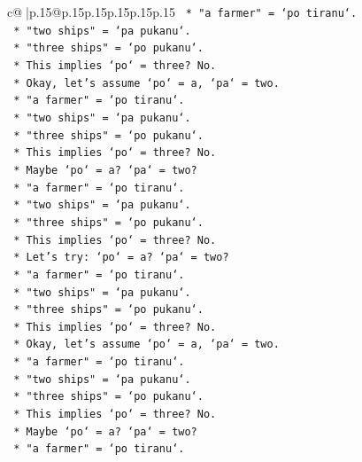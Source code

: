 \documentclass{article}
\begin{document}
{\begin{supertabular}{c@{$\;$}|p{.15\linewidth}@{}p{.15\linewidth}p{.15\linewidth}p{.15\linewidth}p{.15\linewidth}p{.15\linewidth}}
{{{\texttt{                *   "a farmer" = `po tiranu`.} \\
\texttt{                *   "two ships" = `pa pukanu`.} \\
\texttt{                *   "three ships" = `po pukanu`.} \\
\texttt{                *   This implies `po` = three? No.} \\
\texttt{                *   Okay, let's assume `po` = a, `pa` = two.} \\
\texttt{                *   "a farmer" = `po tiranu`.} \\
\texttt{                *   "two ships" = `pa pukanu`.} \\
\texttt{                *   "three ships" = `po pukanu`.} \\
\texttt{                *   This implies `po` = three? No.} \\
\texttt{                *   Maybe `po` = a? `pa` = two?} \\
\texttt{                *   "a farmer" = `po tiranu`.} \\
\texttt{                *   "two ships" = `pa pukanu`.} \\
\texttt{                *   "three ships" = `po pukanu`.} \\
\texttt{                *   This implies `po` = three? No.} \\
\texttt{                *   Let's try: `po` = a? `pa` = two?} \\
\texttt{                *   "a farmer" = `po tiranu`.} \\
\texttt{                *   "two ships" = `pa pukanu`.} \\
\texttt{                *   "three ships" = `po pukanu`.} \\
\texttt{                *   This implies `po` = three? No.} \\
\texttt{                *   Okay, let's assume `po` = a, `pa` = two.} \\
\texttt{                *   "a farmer" = `po tiranu`.} \\
\texttt{                *   "two ships" = `pa pukanu`.} \\
\texttt{                *   "three ships" = `po pukanu`.} \\
\texttt{                *   This implies `po` = three? No.} \\
\texttt{                *   Maybe `po` = a? `pa` = two?} \\
\texttt{                *   "a farmer" = `po tiranu`.} \\
}}}
\end{supertabular}}
\end{document}
